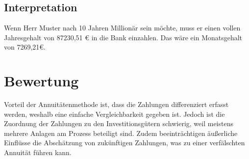 \subsection{Interpretation}

Wenn Herr Muster nach 10 Jahren Millionär sein möchte, muss er einen vollen Jahresgehalt von 87230,51 € in die Bank einzahlen. Das wäre ein Monatsgehalt von 7269,21€.

\section{Bewertung}

Vorteil der Annuitätenmethode ist, dass die Zahlungen differenziert erfasst werden, weshalb eine einfache Vergleichbarkeit gegeben ist. Jedoch ist die Zuordnung der Zahlungen zu den Investitionsgütern schwierig, weil meistens mehrere Anlagen am Prozess beteiligt sind. Zudem beeinträchtigen äußerliche Einflüsse die Abschätzung von zukünftigen Zahlungen, was zu einer verfälschten Annuität führen kann.
